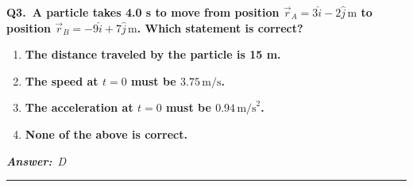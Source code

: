 \documentclass[11pt]{article}
\newcommand{\QuestionStyle}[1]{{\large\bfseries\boldmath #1}}
\newcommand{\AnswerStyle}[1]{{\large\bfseries\boldmath #1}}
\newcommand{\ReasonStyle}[1]{{\normalsize #1}}
\newif\ifshowreason
\newcommand{\Correct}[2]{%
  \item \AnswerStyle{\textcolor{AnsRed}{#1}}%
  \ifshowreason\\[-0.2em]
    \ReasonStyle{\textcolor{AnsRed}{#2}}%
  \fi
}
\newcommand{\Wrong}[2]{%
  \item \AnswerStyle{\textcolor{WrongBlue}{#1}}%
  \ifshowreason\\[-0.2em]
    \ReasonStyle{\textcolor{WrongBlue}{#2}}%
  \fi
}
\newcommand{\QBlock}[4]{%
  \Needspace{8\baselineskip}%
  \noindent
  \begin{minipage}{\linewidth}
    \QuestionStyle{#1.~#2}

    \vspace{0.25em}
    \begin{enumerate}
      #3
    \end{enumerate}

    \vspace{0.1em}
    \noindent\textcolor{AnsRed}{\textit{\textbf{Answer:}~#4}}

    \vspace{0.25em}
    \hrule height 0.4pt
  \end{minipage}
  \vspace{0.75em}
}
\begin{document}
\QBlock{Q3}{A particle takes 4.0 s to move from position $\vec r_A = 3\hat{i}-2\hat{j}\,\text{m}$ to position $\vec r_B = -9\hat{i}+7\hat{j}\,\text{m}$. Which statement is correct?}{%
\Wrong{The distance traveled by the particle is 15 m.}{The value 15 m is the magnitude of the displacement, not necessarily the actual path length. Distance traveled depends on the path taken, which is not specified.}
\Wrong{The speed at $t=0$ must be $3.75\,\text{m/s}$.}{This divides displacement magnitude by elapsed time to get an average rate and then incorrectly treats it as the initial speed. Instantaneous speed at $t=0$ cannot be determined from only the starting point, ending point, and total time.}
\Wrong{The acceleration at $t=0$ must be $0.94\,\text{m/s}^2$.}{Acceleration requires more detailed information about how velocity changes with time. Initial and final position plus total time are not enough to determine the acceleration at a specific instant.}
\Correct{None of the above is correct.}{From the given data, the displacement is $\Delta \vec r=\vec r_B-\vec r_A=(-12\hat{i}+9\hat{j})\,\text{m}$, whose magnitude is $|\Delta \vec r|=\sqrt{(-12)^2+9^2}=15\,\text{m}$. However, that value is not guaranteed to equal the distance traveled, and the initial speed and initial acceleration cannot be inferred from the limited information provided. Therefore A, B, and C are all false.}
}{D}
\end{document}
